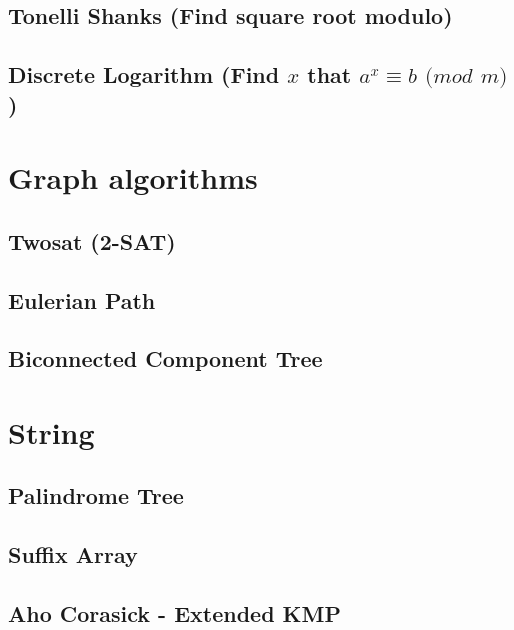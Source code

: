 \subsection{Tonelli Shanks (Find square root modulo)}
\raggedbottom
\hrulefill
\subsection{Discrete Logarithm (Find $x$ that $a^x \equiv b$ $(mod$ $m)$)}
\raggedbottom
\hrulefill

\section{Graph algorithms}
\subsection{Twosat (2-SAT)}
\raggedbottom
\hrulefill
\subsection{Eulerian Path}
\raggedbottom
\hrulefill
\subsection{Biconnected Component Tree}
\raggedbottom
\hrulefill

\section{String}
\subsection{Palindrome Tree}
\raggedbottom
\hrulefill
\subsection{Suffix Array}
\raggedbottom
\hrulefill
\subsection{Aho Corasick - Extended KMP}
\raggedbottom
\hrulefill
